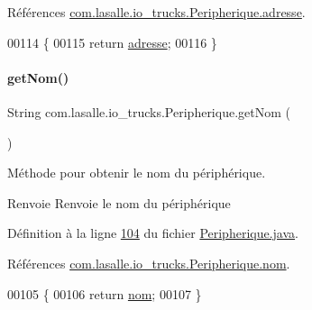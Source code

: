 Références \hyperlink{_peripherique_8java_source_l00041}{com.\+lasalle.\+io\+\_\+trucks.\+Peripherique.\+adresse}.


\begin{DoxyCode}
00114     \{
00115         \textcolor{keywordflow}{return} \hyperlink{classcom_1_1lasalle_1_1io__trucks_1_1_peripherique_a0f0c207b12d3aded58623cfe0f9cd6d2}{adresse};
00116     \}
\end{DoxyCode}
\mbox{\label{classcom_1_1lasalle_1_1io__trucks_1_1_peripherique_abb25c792075ebe58d52419c84004c258}} 
\paragraph{\texorpdfstring{get\+Nom()}{getNom()}}
{\footnotesize\ttfamily String com.\+lasalle.\+io\+\_\+trucks.\+Peripherique.\+get\+Nom (\begin{DoxyParamCaption}{ }\end{DoxyParamCaption})}



Méthode pour obtenir le nom du périphérique. 

\begin{DoxyReturn}{Renvoie}
Renvoie le nom du périphérique 
\end{DoxyReturn}


Définition à la ligne \hyperlink{_peripherique_8java_source_l00104}{104} du fichier \hyperlink{_peripherique_8java_source}{Peripherique.\+java}.



Références \hyperlink{_peripherique_8java_source_l00040}{com.\+lasalle.\+io\+\_\+trucks.\+Peripherique.\+nom}.


\begin{DoxyCode}
00105     \{
00106         \textcolor{keywordflow}{return} \hyperlink{classcom_1_1lasalle_1_1io__trucks_1_1_peripherique_a57ad735952307998eddf5277be95ec95}{nom};
00107     \}
\end{DoxyCode}
\mbox{\label{classcom_1_1lasalle_1_1io__trucks_1_1_peripherique_a1e61a36e2fb0d3665f1dcc41e5ea06b2}} 
